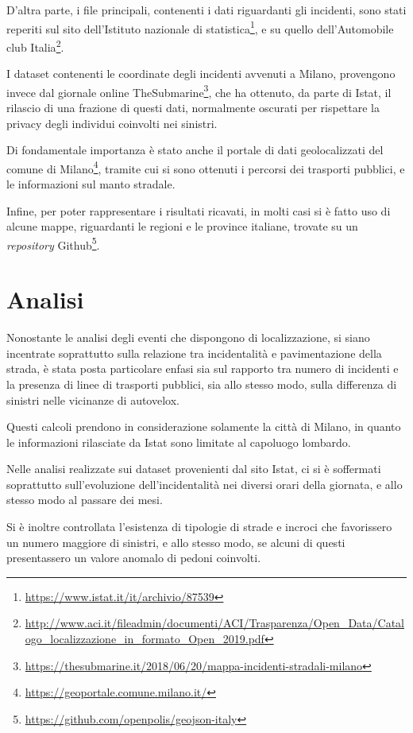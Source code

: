 \documentclass[a4paper]{article}
\newcommand{\skipline}{\vspace{0.2in}}
\begin{document}
D'altra parte, i file principali, contenenti i dati riguardanti gli incidenti, sono 
stati reperiti sul sito 
dell'Istituto nazionale di statistica\footnote{\url{https://www.istat.it/it/archivio/87539}}, 
e su quello dell'Automobile club 
Italia\footnote{\url{http://www.aci.it/fileadmin/documenti/ACI/Trasparenza/Open_Data/Catalogo_localizzazione_in_formato_Open_2019.pdf}}. 

I dataset contenenti le coordinate degli incidenti avvenuti a Milano, 
provengono invece dal giornale online 
TheSubmarine\footnote{\url{https://thesubmarine.it/2018/06/20/mappa-incidenti-stradali-milano}}, 
che ha ottenuto, da parte di Istat, il rilascio di una frazione di questi dati, 
normalmente oscurati per rispettare la privacy degli individui coinvolti nei sinistri. 

Di fondamentale importanza è stato anche il portale di dati geolocalizzati del comune di 
Milano\footnote{\url{https://geoportale.comune.milano.it/}}, 
tramite cui si sono ottenuti i percorsi dei trasporti pubblici, e le 
informazioni sul manto stradale.

Infine, per poter rappresentare i risultati ricavati, in molti casi si è fatto uso di 
alcune mappe, riguardanti le regioni e le province italiane, trovate su un \textit{repository} 
Github\footnote{\url{https://github.com/openpolis/geojson-italy}}.

\section{Analisi}

Nonostante le analisi degli eventi che dispongono di localizzazione, 
si siano incentrate soprattutto sulla relazione tra incidentalità e pavimentazione 
della strada, è stata posta particolare enfasi sia sul rapporto tra numero di 
incidenti e la presenza di linee di trasporti pubblici, sia 
allo stesso modo, sulla differenza di sinistri nelle vicinanze di autovelox. 

Questi calcoli prendono in considerazione solamente la città di Milano, 
in quanto le informazioni rilasciate da Istat sono limitate al capoluogo lombardo.

\skipline
Nelle analisi realizzate sui dataset provenienti dal sito Istat, 
ci si è soffermati soprattutto sull'evoluzione dell'incidentalità nei diversi orari 
della giornata, e allo stesso modo al passare dei mesi. 

Si è inoltre controllata l'esistenza di tipologie di strade e incroci che favorissero 
un numero maggiore di sinistri, e allo stesso modo, se alcuni di questi presentassero 
un valore anomalo di pedoni coinvolti. 
\end{document}
